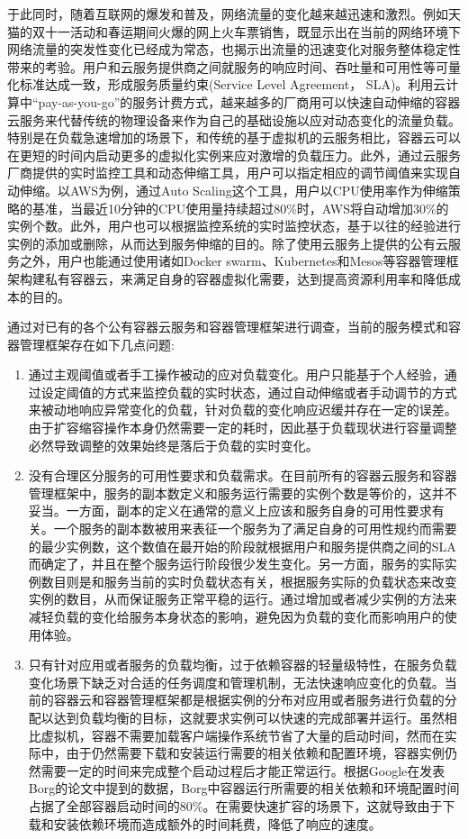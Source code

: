 于此同时，随着互联网的爆发和普及，网络流量的变化越来越迅速和激烈。例如天猫的双十一活动和春运期间火爆的网上火车票销售，既显示出在当前的网络环境下网络流量的突发性变化已经成为常态，也揭示出流量的迅速变化对服务整体稳定性带来的考验。用户和云服务提供商之间就服务的响应时间、吞吐量和可用性等可量化标准达成一致，形成服务质量约束(Service Level Agreement， SLA)\cite{patel2009service}。利用云计算中“pay-as-you-go”的服务计费方式\cite{armbrust2010view}，越来越多的厂商用可以快速自动伸缩的容器云服务来代替传统的物理设备来作为自己的基础设施以应对动态变化的流量负载。特别是在负载急速增加的场景下，和传统的基于虚拟机的云服务相比，容器云可以在更短的时间内启动更多的虚拟化实例来应对激增的负载压力。此外，通过云服务厂商提供的实时监控工具和动态伸缩工具，用户可以指定相应的调节阈值来实现自动伸缩。以AWS为例，通过Auto Scaling这个工具，用户以CPU使用率作为伸缩策略的基准，当最近10分钟的CPU使用量持续超过80\%时，AWS将自动增加30\%的实例个数。此外，用户也可以根据监控系统的实时监控状态，基于以往的经验进行实例的添加或删除，从而达到服务伸缩的目的。除了使用云服务上提供的公有云服务之外，用户也能通过使用诸如Docker swarm、Kubernetes和Mesos等容器管理框架构建私有容器云，来满足自身的容器虚拟化需要，达到提高资源利用率和降低成本的目的。

通过对已有的各个公有容器云服务和容器管理框架进行调查，当前的服务模式和容器管理框架存在如下几点问题:
\begin{enumerate}
\item 通过主观阈值或者手工操作被动的应对负载变化。用户只能基于个人经验，通过设定阈值的方式来监控负载的实时状态，通过自动伸缩或者手动调节的方式来被动地响应异常变化的负载，针对负载的变化响应迟缓并存在一定的误差。由于扩容缩容操作本身仍然需要一定的耗时，因此基于负载现状进行容量调整必然导致调整的效果始终是落后于负载的实时变化。
\item 没有合理区分服务的可用性要求和负载需求。在目前所有的容器云服务和容器管理框架中，服务的副本数定义和服务运行需要的实例个数是等价的，这并不妥当。一方面，副本的定义在通常的意义上应该和服务自身的可用性要求有关。一个服务的副本数被用来表征一个服务为了满足自身的可用性规约而需要的最少实例数，这个数值在最开始的阶段就根据用户和服务提供商之间的SLA而确定了，并且在整个服务运行阶段很少发生变化\cite{beyer2016site}。另一方面，服务的实际实例数目则是和服务当前的实时负载状态有关，根据服务实际的负载状态来改变实例的数目，从而保证服务正常平稳的运行。通过增加或者减少实例的方法来减轻负载的变化给服务本身状态的影响，避免因为负载的变化而影响用户的使用体验。
\item 只有针对应用或者服务的负载均衡，过于依赖容器的轻量级特性，在服务负载变化场景下缺乏对合适的任务调度和管理机制，无法快速响应变化的负载。当前的容器云和容器管理框架都是根据实例的分布对应用或者服务进行负载的分配以达到负载均衡的目标，这就要求实例可以快速的完成部署并运行。虽然相比虚拟机，容器不需要加载客户端操作系统节省了大量的启动时间，然而在实际中，由于仍然需要下载和安装运行需要的相关依赖和配置环境，容器实例仍然需要一定的时间来完成整个启动过程后才能正常运行。根据Google在发表Borg的论文中提到的数据，Borg中容器运行所需要的相关依赖和环境配置时间占据了全部容器启动时间的80\%\cite{verma2015large}。在需要快速扩容的场景下，这就导致由于下载和安装依赖环境而造成额外的时间耗费，降低了响应的速度。
\end{enumerate}

